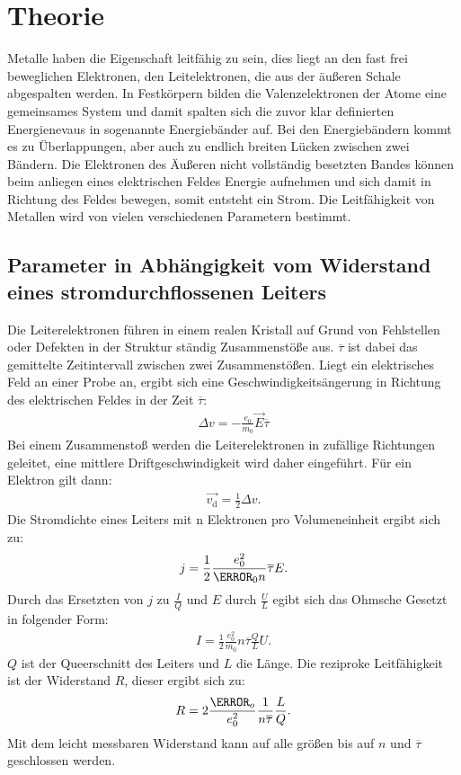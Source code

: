 \section{Theorie}
\label{sec:Theorie}
Metalle haben die Eigenschaft leitfähig zu sein, dies liegt an den
fast frei beweglichen Elektronen, den Leitelektronen, die aus der äußeren Schale abgespalten werden.
In Festkörpern bilden die Valenzelektronen der Atome eine gemeinsames System und damit spalten sich
die zuvor klar definierten Energienevaus in sogenannte Energiebänder auf.
Bei den Energiebändern kommt es zu Überlappungen, aber auch zu endlich breiten Lücken zwischen zwei Bändern.
Die Elektronen des Äußeren nicht vollständig besetzten Bandes können beim anliegen eines elektrischen Feldes Energie aufnehmen
und sich damit in Richtung des Feldes bewegen, somit entsteht ein Strom. Die Leitfähigkeit von Metallen wird von vielen verschiedenen Parametern bestimmt.

\subsection{Parameter in Abhängigkeit vom Widerstand eines stromdurchflossenen Leiters}
Die Leiterelektronen führen in einem realen Kristall auf Grund von Fehlstellen oder Defekten in der Struktur ständig
Zusammenstöße aus. $\overline{\tau}$ ist dabei das gemittelte Zeitintervall zwischen zwei Zusammenstößen. Liegt ein elektrisches Feld an
einer Probe an, ergibt sich eine Geschwindigkeitsängerung in Richtung des elektrischen Feldes in der Zeit $\overline{\tau}$:
\begin{align}
\Delta v=-\frac{e_0}{m_0}\vec{E}\overline{\tau}
\end{align}
Bei einem Zusammenstoß werden die Leiterelektronen in zufällige Richtungen geleitet, eine mittlere Driftgeschwindigkeit wird daher eingeführt.
Für ein Elektron gilt dann:
\begin{align}
\vec{v_\mathrm{d}}=\frac{1}{2}\Delta v.
\end{align}
Die Stromdichte eines Leiters mit n Elektronen pro Volumeneinheit ergibt sich zu:
\begin{align}
j=\frac{1}{2}\frac{e_0^2}{\m_0 n} \overline{\tau} E.
\end{align}
Durch das Ersetzten von $j$ zu $\frac{I}{Q}$ und $E$ durch $\frac{U}{L}$ egibt sich das Ohmsche Gesetzt in folgender Form:
\begin{align}
I=\frac{1}{2}\frac{e_0^2}{m_0}n\overline{\tau} \frac{Q}{L}U.
\end{align}
$Q$ ist der Queerschnitt des Leiters und $L$ die Länge.
Die reziproke Leitfähigkeit ist der Widerstand $R$, dieser ergibt sich zu:
\begin{align}
R=2\frac{\m_o}{e_0^2}\frac{1}{n\overline{\tau}}\frac{L}{Q}\label{eqn:wiederstand}.
\end{align}
Mit dem leicht messbaren Widerstand kann auf alle größen bis auf $n$ und $\overline{\tau}$ geschlossen werden.

